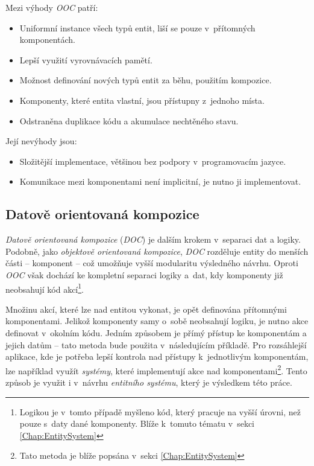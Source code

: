 \noindent Mezi výhody \emph{OOC} patří: 
\begin{itemize}
	\item Uniformní instance všech typů entit, liší se pouze v~přítomných komponentách.
	\item Lepší využití vyrovnávacích pamětí.
	\item Možnost definování nových typů entit za běhu, použitím kompozice.
	\item Komponenty, které entita vlastní, jsou přístupny z~jednoho místa.
	\item Odstraněna duplikace kódu a akumulace nechtěného stavu.
\end{itemize}

\noindent Její nevýhody jsou: 
\begin{itemize}
	\item Složitější implementace, většinou bez podpory v~programovacím jazyce.
	\item Komunikace mezi komponentami není implicitní, je nutno ji implementovat. 
\end{itemize}

\pagebreak

\subsection{Datově orientovaná kompozice}
\label{Chap:DOC}

\emph{Datově orientovaná kompozice} (\emph{DOC}) je dalším krokem v~separaci dat a logiky. Podobně, jako \emph{objektově orientovaná kompozice}, \emph{DOC} rozděluje entity do menších části -- komponent -- což umožňuje vyšší modularitu výsledného návrhu. Oproti \emph{OOC} však dochází ke kompletní separaci logiky a~dat, kdy komponenty již neobsahují kód akcí\footnote{Logikou je v~tomto případě myšleno kód, který pracuje na vyšší úrovni, než pouze s~daty dané komponenty. Blíže k~tomuto tématu v~sekci \ref{Chap:EntitySystem}}.

Množinu akcí, které lze nad entitou vykonat, je opět definována přítomnými komponentami. Jelikož komponenty samy o~sobě neobsahují logiku, je nutno akce definovat v~okolním kódu. Jedním způsobem je přímý přístup ke komponentám a jejich datům -- tato metoda bude použita v~následujícím příkladě. Pro rozsáhlejší aplikace, kde je potřeba lepší kontrola nad přístupy k~jednotlivým komponentám, lze například využít \emph{systémy}, které implementují akce nad komponentami\footnote{Tato metoda je blíže popsána v~sekci \ref{Chap:EntitySystem}}. Tento způsob je využit i v~návrhu \emph{entitního systému}, který je výsledkem této práce.

